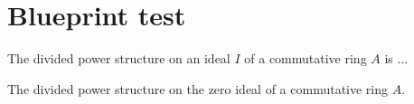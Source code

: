 %

\chapter{Blueprint test}

\begin{definition}
	\label{def:divided_powers}
	\leanok
	The divided power structure on an ideal $I$ of a commutative ring $A$ is ...
\end{definition}

\begin{definition}
	\label{def:divided_powers_bot}
	The divided power structure on the zero ideal of a commutative ring $A$.
\end{definition}